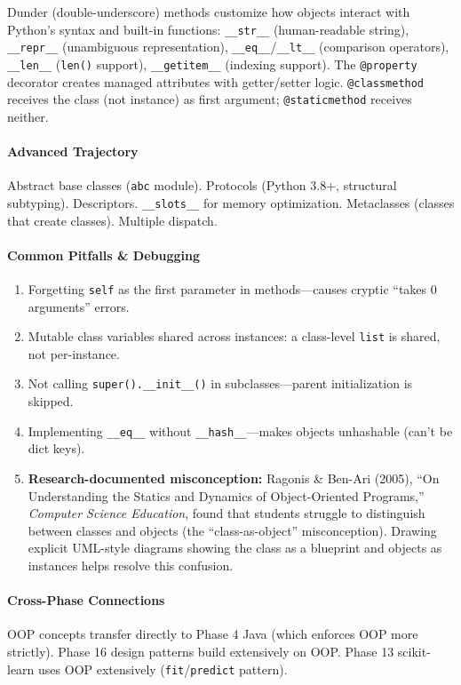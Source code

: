 \documentclass[11pt, a4paper, oneside]{report}
\begin{document}
Dunder (double-underscore) methods customize how objects interact with Python's syntax and built-in functions: \texttt{\_\_str\_\_} (human-readable string), \texttt{\_\_repr\_\_} (unambiguous representation), \texttt{\_\_eq\_\_}/\texttt{\_\_lt\_\_} (comparison operators), \texttt{\_\_len\_\_} (\texttt{len()} support), \texttt{\_\_getitem\_\_} (indexing support). The \texttt{@property} decorator creates managed attributes with getter/setter logic. \texttt{@classmethod} receives the class (not instance) as first argument; \texttt{@staticmethod} receives neither.

\paragraph{Advanced Trajectory} Abstract base classes (\texttt{abc} module). Protocols (Python 3.8+, structural subtyping). Descriptors. \texttt{\_\_slots\_\_} for memory optimization. Metaclasses (classes that create classes). Multiple dispatch.

\paragraph{Common Pitfalls \& Debugging}
\begin{enumerate}[leftmargin=*]
\item Forgetting \texttt{self} as the first parameter in methods---causes cryptic ``takes 0 arguments'' errors.
\item Mutable class variables shared across instances: a class-level \texttt{list} is shared, not per-instance.
\item Not calling \texttt{super().\_\_init\_\_()} in subclasses---parent initialization is skipped.
\item Implementing \texttt{\_\_eq\_\_} without \texttt{\_\_hash\_\_}---makes objects unhashable (can't be dict keys).

\item \textbf{Research-documented misconception:} Ragonis \& Ben-Ari (2005), ``On Understanding the Statics and Dynamics of Object-Oriented Programs,'' \emph{Computer Science Education}, found that students struggle to distinguish between classes and objects (the ``class-as-object'' misconception). Drawing explicit UML-style diagrams showing the class as a blueprint and objects as instances helps resolve this confusion.
\end{enumerate}

\paragraph{Cross-Phase Connections} OOP concepts transfer directly to Phase 4 Java (which enforces OOP more strictly). Phase 16 design patterns build extensively on OOP. Phase 13 scikit-learn uses OOP extensively (\texttt{fit}/\texttt{predict} pattern).
\end{document}
